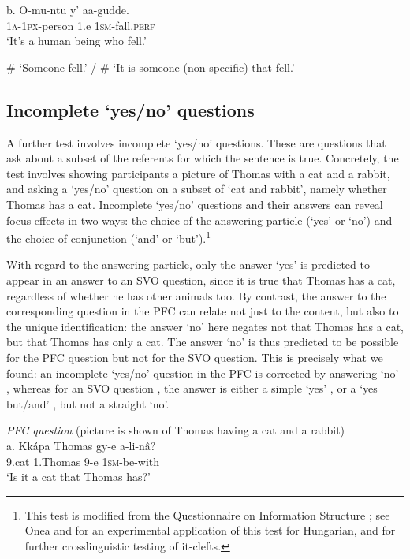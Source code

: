 \documentclass[output=paper]{langsci/langscibook}
\begin{document}
\ea
\gll   b.  O-mu-ntu    y’  aa-gudde.\\
         \textsc{1a-1px}-person  1.e  \textsc{1sm}-fall.\textsc{perf}\\
\glt     ‘It’s a human being who fell.’

\glt     \# ‘Someone fell.’ / \# ‘It is someone (non-specific) that fell.’
\z

\subsection{Incomplete ‘yes/no’ questions} %

A further test involves incomplete ‘yes/no’ questions. These are questions that ask about a subset of the referents for which the sentence is true. Concretely, the test involves showing participants a picture of Thomas with a cat and a rabbit, and asking a ‘yes/no’ question on a subset of ‘cat and rabbit’, namely whether Thomas has a cat. Incomplete ‘yes/no’ questions and their answers can reveal focus effects in two ways: the choice of the answering particle (‘yes’ or ‘no’) and the choice of conjunction (‘and’ or ‘but’).\footnote{This test is modified from the Questionnaire on Information Structure \citep{SkopeteasEtAl2006}; see Onea and \citet{Beaver2011} for an experimental application of this test for Hungarian, and \citet{DestruelEtAl2014} for further crosslinguistic testing of it-clefts.}

  With regard to the answering particle, only the answer ‘yes’ is predicted to appear in an answer to an SVO question, since it is true that Thomas has a cat, regardless of whether he has other animals too. By contrast, the answer to the corresponding question in the PFC can relate not just to the content, but also to the unique identification: the answer ‘no’ here negates not that Thomas has a cat, but that Thomas has only a cat. The answer ‘no’ is thus predicted to be possible for the PFC question but not for the SVO question. This is precisely what we found: an incomplete ‘yes/no’ question in the PFC  is corrected by answering ‘no’ , whereas for an SVO question , the answer is either a simple ‘yes’ , or a ‘yes but/and’ , but not a straight ‘no’. 

\ea
{\textit{PFC question}}
       (picture is shown of Thomas having a cat and a rabbit)\\
\gll   a.  Kkápa  Thomas  gy-e  a-li-nâ?\\
         9.cat  1.Thomas  9-e  \textsc{1sm}-be-with\\
\glt     ‘Is it a cat that Thomas has?’
\z
\end{document}
